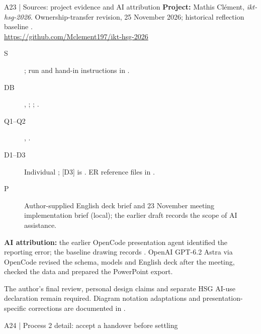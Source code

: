 \begin{frame}{A23 | Sources: project evidence and AI attribution}
\fontsize{8.3}{10.2}\selectfont
\textbf{Project:} Mathis Clément, \emph{ikt-hsg-2026}. Ownership-transfer revision, 25 November 2026; historical reflection baseline .\\
\url{https://github.com/Mclement197/ikt-hsg-2026}
\begin{description}
\item[S] ; run and hand-in instructions in .
\item[DB] , ; ; .
\item[Q1–Q2] , .
\item[D1–D3] Individual ; [D3] is . ER reference files in .
\item[P] Author-supplied English deck brief and 23 November meeting implementation brief (local); the earlier draft records the scope of AI assistance.
\end{description}
\textbf{AI attribution:} the earlier OpenCode presentation agent identified the reporting error; the baseline drawing records . OpenAI GPT-6.2 Astra via OpenCode revised the schema, models and English deck after the meeting, checked the data and prepared the PowerPoint export.
\par\smallskip
The author's final review, personal design claims and separate HSG AI-use declaration remain required. Diagram notation adaptations and presentation-specific corrections are documented in .
\end{frame}

\begin{frame}{A24 | Process 2 detail: accept a handover before settling}
\begin{center}\end{center}
\end{frame}

